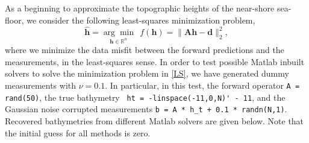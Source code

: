 As a beginning to approximate the topographic heights of the near-shore sea-floor,  we consider the following least-squares minimization problem,
\begin{equation}\label{LS}
\mathbf{\hat{h}}= \underset{\mathbf{h} \in \mathbb{R}^n}{\arg \min} \ \ f(\mathbf{h}) = \|  \mathbf{A}\mathbf{h} -  \mathbf{d} \|_2^2,
\end{equation}
where we minimize the data misfit between the forward predictions and the measurements, in the least-squares sense. In order to test possible Matlab inbuilt solvers to solve the minimization problem in  \eqref{LS}, we have generated dummy measurements with $\nu = 0.1$. In particular, in this test, the forward operator \verb|A = rand(50)|, the true bathymetry \verb| ht = -linspace(-11,0,N)' - 11|, and the Gaussian noise corrupted measurements \verb|b = A * h_t + 0.1 * randn(N,1)|. Recovered bathymetries from different Matlab solvers are given below. Note that the initial guess for all methods is zero. 
